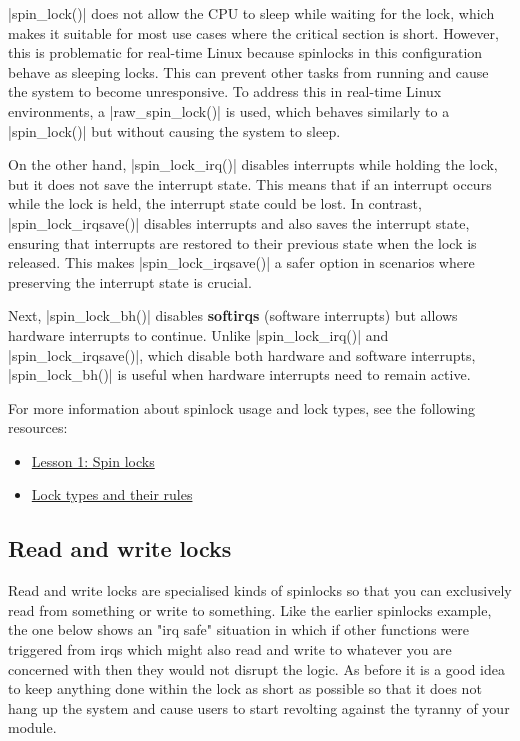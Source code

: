 \documentclass[10pt, oneside]{book}
\begin{document}
\cpp|spin_lock()| does not allow the CPU to sleep while waiting for the lock, which makes it suitable for most use cases where the critical section is short.
However, this is problematic for real-time Linux because spinlocks in this configuration behave as sleeping locks.
This can prevent other tasks from running and cause the system to become unresponsive.
To address this in real-time Linux environments, a \cpp|raw_spin_lock()| is used, which behaves similarly to a \cpp|spin_lock()| but without causing the system to sleep.

On the other hand, \cpp|spin_lock_irq()| disables interrupts while holding the lock, but it does not save the interrupt state.
This means that if an interrupt occurs while the lock is held, the interrupt state could be lost.
In contrast, \cpp|spin_lock_irqsave()| disables interrupts and also saves the interrupt state, ensuring that interrupts are restored to their previous state when the lock is released.
This makes \cpp|spin_lock_irqsave()| a safer option in scenarios where preserving the interrupt state is crucial.

Next, \cpp|spin_lock_bh()| disables \textbf{softirqs} (software interrupts) but allows hardware interrupts to continue.
Unlike \cpp|spin_lock_irq()| and \cpp|spin_lock_irqsave()|, which disable both hardware and software interrupts, \cpp|spin_lock_bh()| is useful when hardware interrupts need to remain active.

For more information about spinlock usage and lock types, see the following resources:
\begin{itemize}
  \item \href{https://www.kernel.org/doc/Documentation/locking/spinlocks.txt}{Lesson 1: Spin locks}
  \item \href{https://docs.kernel.org/locking/locktypes.html}{Lock types and their rules}
\end{itemize}

\subsection{Read and write locks}
\label{sec:rwlock}
Read and write locks are specialised kinds of spinlocks so that you can exclusively read from something or write to something.
Like the earlier spinlocks example, the one below shows an "irq safe" situation in which if other functions were triggered from irqs which might also read and write to whatever you are concerned with then they would not disrupt the logic.
As before it is a good idea to keep anything done within the lock as short as possible so that it does not hang up the system and cause users to start revolting against the tyranny of your module.
\end{document}
